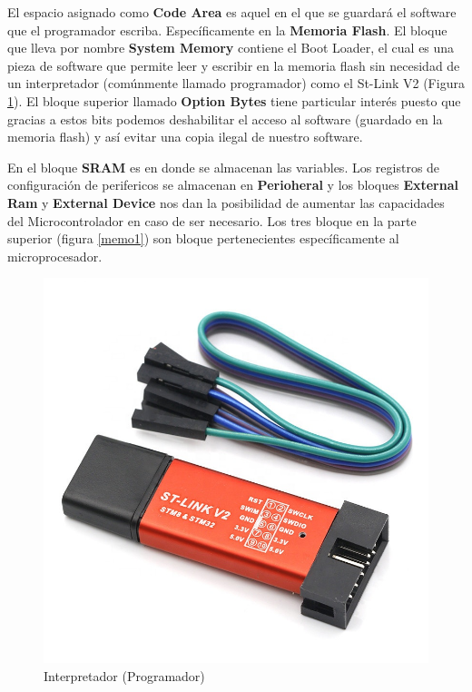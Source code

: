 \documentclass[a4paper,12pt]{report} %
\begin{document}
El espacio asignado como \textbf{Code Area} es aquel en el que se guardará el software que el programador escriba. Específicamente en la \textbf{Memoria Flash}. El bloque que lleva por nombre \textbf{System Memory} contiene el Boot Loader, el cual es una pieza de software que permite leer y escribir en la memoria flash sin necesidad de un interpretador (comúnmente llamado programador) como el St-Link V2 (Figura \ref{stlink}). El bloque superior llamado \textbf{Option Bytes} tiene particular interés puesto que gracias a estos bits podemos deshabilitar el acceso al software (guardado en la memoria flash) y así evitar una copia ilegal de nuestro software.

En el bloque \textbf{SRAM} es en donde se almacenan las variables. Los registros de configuración de perifericos se almacenan en \textbf{Perioheral} y los bloques \textbf{External Ram} y \textbf{External Device} nos dan la posibilidad de aumentar las capacidades del Microcontrolador en caso de ser necesario. Los tres bloque en la parte superior (figura \ref{memo1}) son bloque pertenecientes específicamente al microprocesador.


\begin{figure}[H]
	\centering
	\includegraphics[scale=0.3]{Imagenes/stm/stlink}
	\caption{Interpretador (Programador)}
	\label{stlink}
\end{figure}
\end{document}
